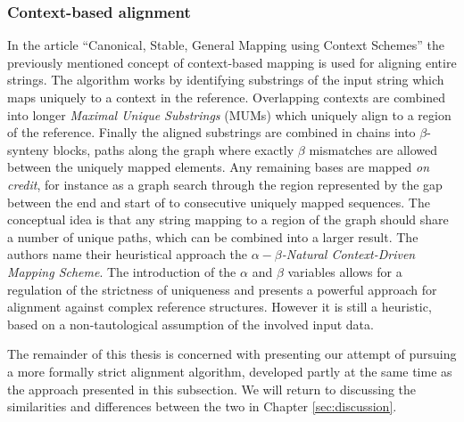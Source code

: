 \documentclass[thesis.tex]{subfiles}
\begin{document}
\subsubsection{Context-based alignment}
\label{sec:canonical}
In the article ``Canonical, Stable, General Mapping using Context Schemes''\cite{canonical_stable_general_mapping_using_context_schemes} the previously mentioned concept of context-based mapping is used for aligning entire strings. The algorithm works by identifying substrings of the input string which maps uniquely to a context in the reference. Overlapping contexts are combined into longer \textit{Maximal Unique Substrings} (MUMs) which uniquely align to a region of the reference. Finally the aligned substrings are combined in chains into $\beta$-synteny blocks, paths along the graph where exactly $\beta$ mismatches are allowed between the uniquely mapped elements. Any remaining bases are mapped \textit{on credit}, for instance as a graph search through the region represented by the gap between the end and start of to consecutive uniquely mapped sequences. The conceptual idea is that any string mapping to a region of the graph should share a number of unique paths, which can be combined into a larger result. The authors name their heuristical approach the \textit{$\alpha-\beta$-Natural Context-Driven Mapping Scheme}. The introduction of the $\alpha$ and $\beta$ variables allows for a regulation of the strictness of uniqueness and presents a powerful approach for alignment against complex reference structures. However it is still a heuristic, based on a non-tautological assumption of the involved input data.\\
\par\noindent
The remainder of this thesis is concerned with presenting our attempt of pursuing a more formally strict alignment algorithm, developed partly at the same time as the approach presented in this subsection. We will return to discussing the similarities and differences between the two in Chapter \ref{sec:discussion}.
\end{document}
